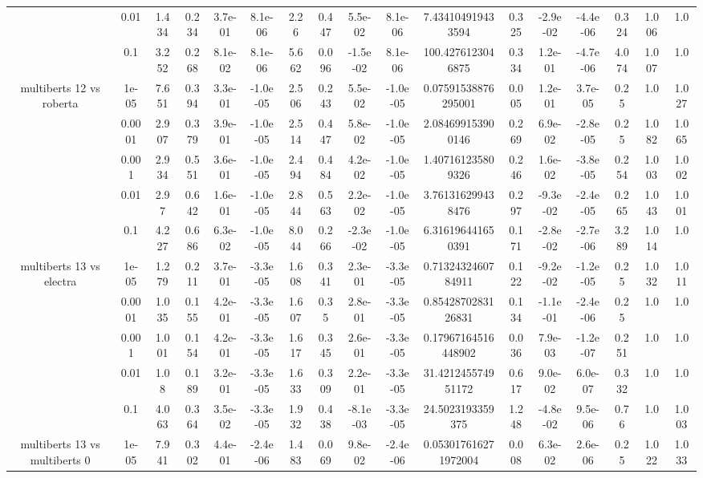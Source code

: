 \begin{tabular}{|c|c|c|c|c|c|c|c|c|c|c|c|c|c|c|c|c|}
 & 0.01 & 1.434 & 0.234 & 3.7e-01 & 8.1e-06 & 2.26 & 0.447 & 5.5e-02 & 8.1e-06 & 7.434104919433594 & 0.325 & -2.9e-02 & -4.4e-06 & 0.324 & 1.006 & 1.0 \\
 & 0.1 & 3.252 & 0.268 & 8.1e-02 & 8.1e-06 & 5.662 & 0.096 & -1.5e-02 & 8.1e-06 & 100.4276123046875 & 0.334 & 1.2e-01 & -4.7e-06 & 4.074 & 1.007 & 1.0 \\
\hline
\multirow{5}{*}{multiberts 12 vs roberta } & 1e-05 & 7.651 & 0.394 & 3.3e-01 & -1.0e-05 & 2.506 & 0.243 & 5.5e-02 & -1.0e-05 & 0.07591538876295001 & 0.005 & 1.2e-01 & 3.7e-05 & 0.25 & 1.0 & 1.027 \\
 & 0.0001 & 2.907 & 0.379 & 3.9e-01 & -1.0e-05 & 2.514 & 0.447 & 5.8e-02 & -1.0e-05 & 2.084699153900146 & 0.269 & 6.9e-02 & -2.8e-05 & 0.25 & 1.082 & 1.065 \\
 & 0.001 & 2.934 & 0.551 & 3.6e-01 & -1.0e-05 & 2.494 & 0.484 & 4.2e-02 & -1.0e-05 & 1.407161235809326 & 0.246 & 1.6e-02 & -3.8e-05 & 0.254 & 1.003 & 1.002 \\
 & 0.01 & 2.97 & 0.642 & 1.6e-01 & -1.0e-05 & 2.844 & 0.563 & 2.2e-02 & -1.0e-05 & 3.761316299438476 & 0.297 & -9.3e-02 & -2.4e-05 & 0.265 & 1.043 & 1.001 \\
 & 0.1 & 4.227 & 0.686 & 6.3e-02 & -1.0e-05 & 8.044 & 0.266 & -2.3e-02 & -1.0e-05 & 6.316196441650391 & 0.171 & -2.8e-02 & -2.7e-06 & 3.289 & 1.014 & 1.0 \\
\hline
\multirow{5}{*}{multiberts 13 vs electra } & 1e-05 & 1.279 & 0.211 & 3.7e-01 & -3.3e-05 & 1.608 & 0.341 & 2.3e-01 & -3.3e-05 & 0.7132432460784911 & 0.122 & -9.2e-02 & -1.2e-05 & 0.25 & 1.032 & 1.011 \\
 & 0.0001 & 1.035 & 0.155 & 4.2e-01 & -3.3e-05 & 1.607 & 0.35 & 2.8e-01 & -3.3e-05 & 0.8542870283126831 & 0.134 & -1.1e-01 & -2.4e-06 & 0.25 & 1.0 & 1.0 \\
 & 0.001 & 1.001 & 0.154 & 4.2e-01 & -3.3e-05 & 1.617 & 0.345 & 2.6e-01 & -3.3e-05 & 0.17967164516448902 & 0.036 & 7.9e-03 & -1.2e-07 & 0.251 & 1.0 & 1.0 \\
 & 0.01 & 1.08 & 0.189 & 3.2e-01 & -3.3e-05 & 1.633 & 0.309 & 2.2e-01 & -3.3e-05 & 31.421245574951172 & 0.617 & 9.0e-02 & 6.0e-07 & 0.332 & 1.0 & 1.0 \\
 & 0.1 & 4.063 & 0.364 & 3.5e-02 & -3.3e-05 & 1.932 & 0.438 & -8.1e-03 & -3.3e-05 & 24.5023193359375 & 1.248 & -4.8e-02 & 9.5e-06 & 0.76 & 1.0 & 1.003 \\
\hline
\multirow{5}{*}{multiberts 13 vs multiberts 0} & 1e-05 & 7.941 & 0.302 & 4.4e-01 & -2.4e-06 & 1.483 & 0.069 & 9.8e-02 & -2.4e-06 & 0.053017616271972004 & 0.008 & 6.3e-02 & 2.6e-06 & 0.25 & 1.022 & 1.033 \\

\end{tabular}
